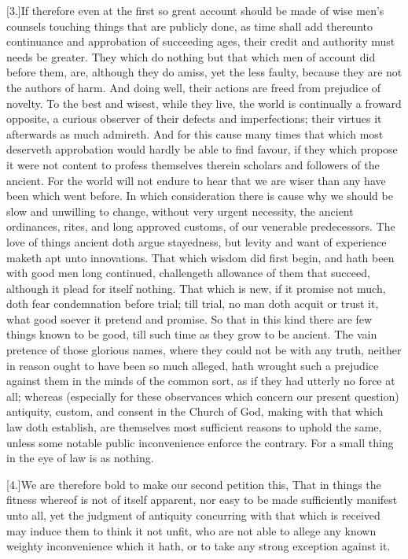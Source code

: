 [3.]If therefore even at the first so great account should be made of wise men’s counsels touching things that are publicly done, as time shall add thereunto continuance and approbation  of succeeding ages, their credit and authority must needs be greater.
 They which do nothing but that which men of account did before them, are, although they do amiss, yet the less faulty, because they are not the authors of harm. And doing well, their actions are freed from prejudice of novelty. To the best and wisest, while they live, the world is continually a froward opposite, a curious observer of their defects and imperfections; their virtues it afterwards as much admireth. And for this cause many times that which most deserveth approbation would hardly be able to find favour, if they which propose it were not content to profess themselves therein scholars and followers of the ancient. For the world will not endure to hear that we are wiser than any have been which went before. In which consideration there is cause why we should be slow and unwilling to change, without very urgent necessity, the ancient ordinances, rites, and long approved customs, of our venerable predecessors. The love of things ancient doth argue stayedness, but levity and want of experience maketh apt unto innovations. That which wisdom did first begin, and hath been with good men long continued, challengeth allowance of them that succeed, although it plead for itself nothing. That which is new, if it promise not much, doth fear condemnation before trial; till trial, no man doth acquit or trust it, what good soever it pretend and promise. So that in this kind there are few things known to be good, till such time as they grow to be ancient. The vain pretence of those glorious names, where they could not be with any truth, neither in reason ought to have been so much alleged, hath wrought such a prejudice against them in the minds of the common sort, as if they had utterly no force at all; whereas (especially for these observances which concern our present question) antiquity, custom, and consent in the Church of God, making with that which law doth establish, are themselves most sufficient reasons to uphold the  same, unless some notable public inconvenience enforce the contrary.
 For a small thing in the eye of law is as nothing.

[4.]We are therefore bold to make our second petition this, That in things the fitness whereof is not of itself apparent, nor easy to be made sufficiently manifest unto all, yet the judgment of antiquity concurring with that which is received may induce them to think it not unfit, who are not able to allege any known weighty inconvenience which it hath, or to take any strong exception against it.


